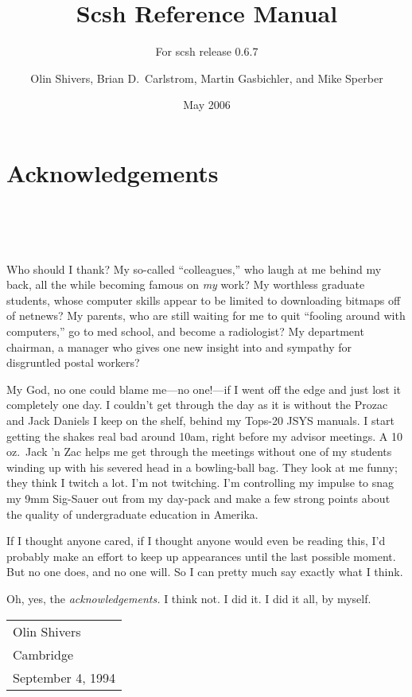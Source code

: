 
\title{Scsh Reference Manual}
\subtitle{For scsh release 0.6.7}
\author{Olin Shivers, Brian D.~Carlstrom, Martin Gasbichler, and Mike Sperber}
\date{May 2006}

\maketitle
\texonly
\chapter*{Acknowledgements}
\endtexonly
\htmlonly
\\  \\ \\
\endhtmlonly

Who should I thank?
My so-called ``colleagues,'' who laugh at me behind my back,
    all the while becoming famous on {\em my\/} work?
My worthless graduate students, whose computer skills appear to
    be limited to downloading bitmaps off of netnews?
My parents, who are still waiting for me to quit ``fooling around with
    computers,'' go to med school, and become a radiologist?
My department chairman, a manager who gives one new insight into
    and sympathy for disgruntled postal workers?

My God, no one could blame me---no one!---if I went off the edge and just
    lost it completely one day.
I couldn't get through the day as it is without the Prozac and Jack Daniels
    I keep on the shelf, behind my Tops-20 JSYS manuals.
    I start getting the shakes real bad around 10am, right before my
    advisor meetings. A 10 oz.\ Jack 'n Zac helps me get through the
    meetings without one of my students winding up with his severed head
    in a bowling-ball bag. They look at me funny; they think I twitch a
    lot. I'm not twitching. I'm controlling my impulse to snag my 9mm
    Sig-Sauer out from my day-pack and make a few strong points about
    the quality of undergraduate education in Amerika.

If I thought anyone cared, if I thought anyone would even be reading this,
I'd probably make an effort to keep up appearances until the last possible
moment. But no one does, and no one will. So I can pretty much say exactly
what I think.

Oh, yes, the {\em acknowledgements.}
I think not. I did it. I did it all, by myself.
\begin{flushright}
\begin{tabular}{l}
Olin Shivers    \\
Cambridge       \\
September 4, 1994
\end{tabular}
\end{flushright}

\tableofcontents
